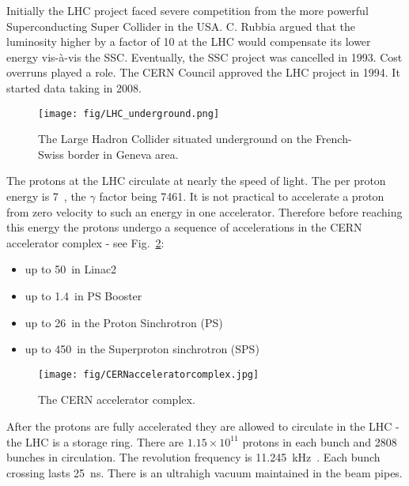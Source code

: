 Initially the LHC project faced severe competition from the more powerful Superconducting Super Collider in the USA. C. Rubbia argued that the luminosity higher by a factor of 10 at the LHC would compensate its lower energy vis-à-vis the SSC. Eventually, the SSC project was cancelled in 1993. Cost overruns played a role. The CERN Council approved the LHC project in 1994. It started data taking in 2008.

\begin{figure}[htpb]
  \centering
  \texttt{[image: fig/LHC\_underground.png]}
  \caption{The Large Hadron Collider situated underground on the French-Swiss border in Geneva area.}
  \label{fig:LHC_underground}
\end{figure}

The protons at the LHC circulate at nearly the speed of light. The per proton energy is 7~\TeV, the $\gamma$ factor being 7461. It is not practical to accelerate a proton from zero velocity to such an energy in one accelerator. Therefore before reaching this energy the protons undergo a sequence of accelerations in the CERN accelerator complex - see Fig.~\ref{fig:CERN_accelerator_complex}:

\begin{itemize}
\item up to 50~\MeV in Linac2
\item up to 1.4~\GeV in PS Booster
\item up to 26~\GeV in the Proton Sinchrotron (PS)
\item up to 450~\GeV in the Superproton sinchrotron (SPS)
\end{itemize}

\begin{figure}[htpb]
  \centering
  \texttt{[image: fig/CERNacceleratorcomplex.jpg]}
  \caption{The CERN accelerator complex.}
  \label{fig:CERN_accelerator_complex}
\end{figure}

After the protons are fully accelerated they are allowed to circulate in the LHC - the LHC is a storage ring. There are $1.15\times10^{11}$ protons in each bunch and 2808 bunches in circulation. The revolution frequency is 11.245~kHz~\cite{Bruning:2004ej}. Each bunch crossing lasts 25~ns. There is an ultrahigh vacuum maintained in the beam pipes.

